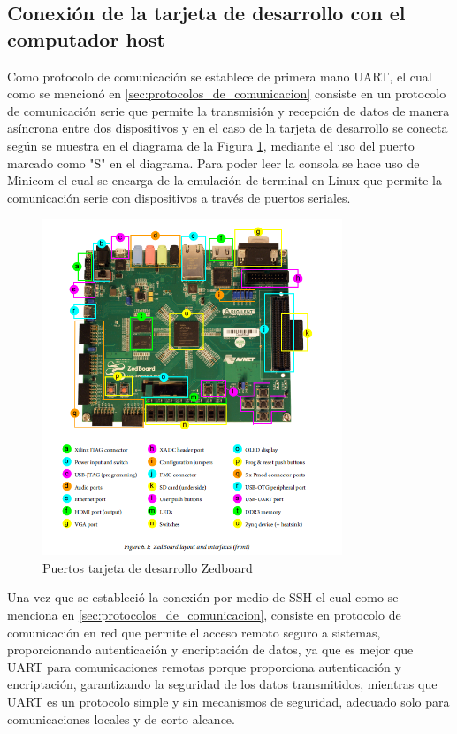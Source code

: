 \subsection{Conexión de la tarjeta de desarrollo con el computador host}

Como protocolo de comunicación se establece de primera mano UART, el cual como se mencionó en \ref{sec:protocolos_de_comunicacion} consiste en un protocolo de comunicación serie que permite la transmisión y recepción de datos de manera asíncrona entre dos dispositivos y en el caso de la tarjeta de desarrollo se conecta según se muestra en el diagrama de la Figura \ref{fig:puertos_zedboard}, mediante el uso del puerto marcado como "S" en el diagrama. Para poder leer la consola se hace uso de Minicom el cual se encarga de la emulación de terminal en Linux que permite la comunicación serie con dispositivos a través de puertos seriales.

\begin{figure}[h!]
    \centering
    \includegraphics[width=0.8\textwidth]{fig/especifico_2/154140ZedBoard.png}
    \caption{Puertos tarjeta de desarrollo Zedboard}
    \label{fig:puertos_zedboard}
\end{figure}


Una vez que se estableció la conexión por medio de SSH el cual como se menciona en \ref{sec:protocolos_de_comunicacion}, consiste en protocolo de comunicación en red que permite el acceso remoto seguro a sistemas, proporcionando autenticación y encriptación de datos, ya que es mejor que UART para comunicaciones remotas porque proporciona autenticación y encriptación, garantizando la seguridad de los datos transmitidos, mientras que UART es un protocolo simple y sin mecanismos de seguridad, adecuado solo para comunicaciones locales y de corto alcance. 

